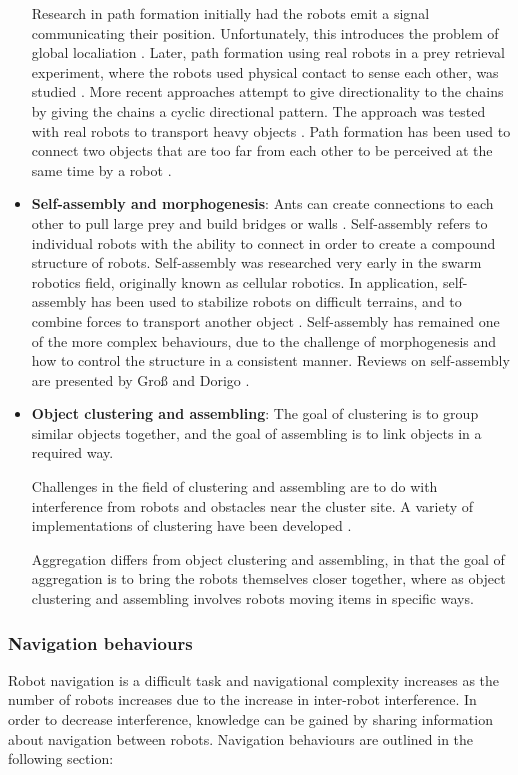 \begin{itemize}
	Research in path formation initially had the robots emit a signal communicating their position. Unfortunately, this introduces the problem of global localiation \cite{goss1992harvesting}. Later, path formation using real robots in a prey retrieval experiment, where the robots used physical contact to sense each other, was studied \cite{werger1996robotic}. More recent approaches attempt to give directionality to the chains by giving the chains a cyclic directional pattern. The approach was tested with real robots to transport heavy objects \cite{nouyan2006group}. Path formation has been used to connect two objects that are too far from each other to be perceived at the same time by a robot \cite{nouyan2006chain}.

	\item \textbf{Self-assembly and morphogenesis}: 
	Ants can create connections to each other to pull large prey and build bridges or walls \cite{reid2015army,mccreery2014cooperative}. Self-assembly refers to individual robots with the ability to connect in order to create a compound structure of robots. Self-assembly was researched very early in the swarm robotics field, originally known as cellular robotics. In application, self-assembly has been used to stabilize robots on difficult terrains, and to combine forces to transport another object \cite{brambilla2013swarm}. Self-assembly has remained one of the more complex behaviours, due to the challenge of morphogenesis and how to control the structure in a consistent manner. Reviews on self-assembly are presented by Gro{\ss} and Dorigo \cite{gross2008self}.
	
	\item \textbf{Object clustering and assembling}:
	The goal of clustering is to group similar objects together, and the goal of assembling is to link objects in a required way.
	
	Challenges in the field of clustering and assembling are to do with interference from robots and obstacles near the cluster site. A variety of implementations of clustering have been developed \cite{beckers1994local}. 

	Aggregation differs from object clustering and assembling, in that the goal of aggregation is to bring the robots themselves closer together, where as object clustering and assembling involves robots moving items in specific ways.
\end{itemize}

\subsubsection{Navigation behaviours}
Robot navigation is a difficult task and navigational complexity increases as the number of robots increases due to the increase in inter-robot interference.  In order to decrease interference, knowledge can be gained by sharing information about navigation between robots. Navigation behaviours are outlined in the following section:

